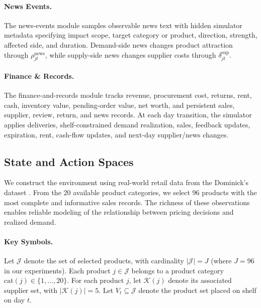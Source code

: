 \paragraph{News Events.}
The news-events module samples observable news text with hidden simulator metadata specifying impact scope, target category or product, direction, strength, affected side, and duration. Demand-side news changes product attraction through $\rho^{\mathrm{news}}_{jt}$, while supply-side news changes supplier costs through $\delta^{\mathrm{sup}}_{jt}$.

\paragraph{Finance \& Records.}
The finance-and-records module tracks revenue, procurement cost, returns, rent, cash, inventory value, pending-order value, net worth, and persistent sales, supplier, review, return, and news records. At each day transition, the simulator applies deliveries, shelf-constrained demand realization, sales, feedback updates, expiration, rent, cash-flow updates, and next-day supplier/news changes.

\subsection{State and Action Spaces}
\label{app:state_action_spaces}

We construct the environment using real-world retail data from the Dominick’s dataset \citep{DominicksDataset}. From the 20 available product categories, we select 96 products with the most complete and informative sales records. The richness of these observations enables reliable modeling of the relationship between pricing decisions and realized demand.

\paragraph{Key Symbols.}
Let $\mathcal{J}$ denote the set of selected products, with cardinality $|\mathcal{J}| = J$ (where $J=96$ in our experiments). Each product $j \in \mathcal{J}$ belongs to a product category $\mathrm{cat}(j) \in \{1,\ldots,20\}$. For each product $j$, let $\mathcal{K}(j)$ denote its associated supplier set, with $|\mathcal{K}(j)| = 5$. Let $V_t\subseteq\mathcal{J}$ denote the product set placed on shelf on day $t$.

